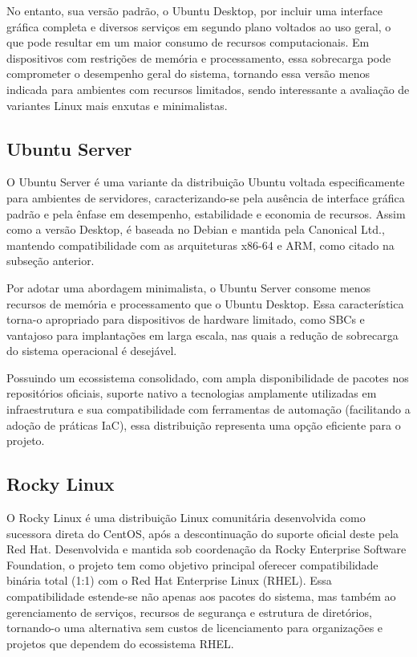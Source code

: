No entanto, sua versão padrão, o Ubuntu Desktop, por incluir uma interface gráfica completa e diversos serviços em segundo plano voltados ao uso geral, o que pode resultar em um maior consumo de recursos computacionais. Em dispositivos com restrições de memória e processamento, essa sobrecarga pode comprometer o desempenho geral do sistema, tornando essa versão menos indicada para ambientes com recursos limitados, sendo interessante a avaliação de variantes Linux mais enxutas e minimalistas.

\subsection{Ubuntu Server}
\label{subsection:UbuntuServer}

O Ubuntu Server \citep{ubuntusrvr2025} é uma variante da distribuição Ubuntu voltada especificamente para ambientes de servidores, caracterizando-se pela ausência de interface gráfica padrão e pela ênfase em desempenho, estabilidade e economia de recursos. Assim como a versão Desktop, é baseada no Debian e mantida pela Canonical Ltd., mantendo compatibilidade com as arquiteturas x86-64 e ARM, como citado na subseção anterior.

Por adotar uma abordagem minimalista, o Ubuntu Server consome menos recursos de memória e processamento que o Ubuntu Desktop. Essa característica torna-o apropriado para dispositivos de hardware limitado, como SBCs e vantajoso para implantações em larga escala, nas quais a redução de sobrecarga do sistema operacional é desejável.

Possuindo um ecossistema consolidado, com ampla disponibilidade de pacotes nos repositórios oficiais, suporte nativo a tecnologias amplamente utilizadas em infraestrutura e sua compatibilidade com ferramentas de automação (facilitando a adoção de práticas IaC), essa distribuição representa uma opção eficiente para o projeto.

\subsection{Rocky Linux}
\label{subsection:RockyLinux}

O Rocky Linux \citep{rocky2025} é uma distribuição Linux comunitária desenvolvida como sucessora direta do CentOS, após a descontinuação do suporte oficial deste pela Red Hat. Desenvolvida e mantida sob coordenação da Rocky Enterprise Software Foundation, o projeto tem como objetivo principal oferecer compatibilidade binária total (1:1) com o Red Hat Enterprise Linux (RHEL). Essa compatibilidade estende-se não apenas aos pacotes do sistema, mas também ao gerenciamento de serviços, recursos de segurança e estrutura de diretórios, tornando-o uma alternativa sem custos de licenciamento para organizações e projetos que dependem do ecossistema RHEL.

